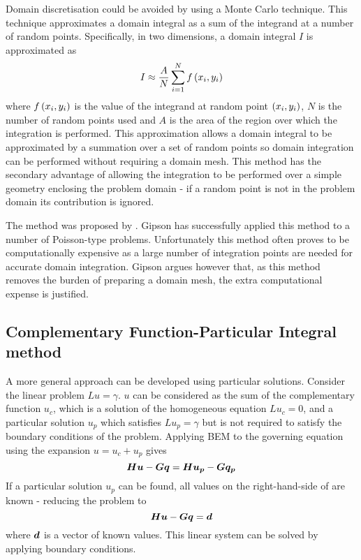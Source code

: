 Domain discretisation could be avoided by using a Monte Carlo technique.
This technique approximates a domain integral as a sum of the integrand
at a number of random points. Specifically, in two dimensions, a domain
integral $I$ is approximated as 
\begin{equation}
  I \approx \dfrac{A}{N}  \displaystyle\sum_{i=1}^{N}   f\left( x_{i},y_{i} \right) 
\end{equation}
where $ f\left( x_{i},y_{i} \right) $ is the value of the integrand at random point
$\left( x_{i},y_{i} \right)$, $N$ is the number of random points used and $A$ is the
area of the region over which the integration is performed.  This
approximation allows a domain integral to be approximated by a summation
over a set of random points so domain integration can be performed without
requiring a domain mesh.  This method has the secondary advantage of
allowing the integration to be performed over a simple geometry enclosing
the problem domain - if a random point is not in the problem domain its
contribution is ignored.

The method was proposed by \citet{gipson:1987}.  Gipson has
successfully applied this method to a number of Poisson-type problems.
Unfortunately this method often proves to be computationally expensive as a
large number of integration points are needed for accurate domain
integration.  Gipson argues however that, as this method removes the burden
of preparing a domain mesh, the extra computational expense is justified.

\subsection{Complementary Function-Particular Integral method}
\label{sec:anapim}

A more general approach can be developed using particular solutions.  Consider
the linear problem $Lu = \gamma$. $u$ can be considered as the sum of the
complementary function $u_{c}$, which is a solution of the homogeneous
equation $Lu_{c} = 0$, and a particular solution $u_{p}$ which satisfies
$Lu_{p} = \gamma$ but is not required to satisfy the boundary conditions of
the problem.  Applying BEM to the governing equation using the expansion 
 $u =u_{c} + u_{p}$ gives
\begin{equation}
  \matr{H} \vect{u} - \matr{G} \vect{q} = \matr{H} \vect{u_{p}} - \matr{G}
  \vect{q_{p}}
\label{eq:partic}
\end{equation}
If a particular solution $u_{p}$ can be found, all values on the
right-hand-side of  are known - reducing the problem to
\begin{equation}
  \matr{H} \vect{u} - \matr{G} \vect{q} = \vect{d}
\end{equation}
where $\vect{d}$ is a vector of known values.  This linear system can be
solved by applying boundary conditions.  

